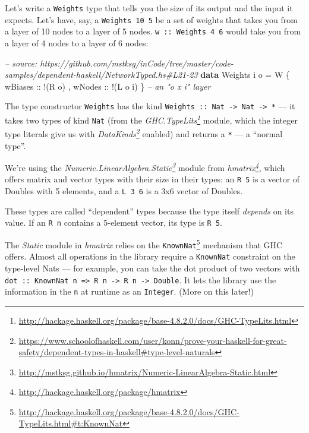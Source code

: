 \documentclass[]{article}
\newenvironment{Shaded}{}{}
\newcommand{\KeywordTok}[1]{\textcolor[rgb]{0.00,0.44,0.13}{\textbf{#1}}}
\newcommand{\DataTypeTok}[1]{\textcolor[rgb]{0.56,0.13,0.00}{#1}}
\newcommand{\CommentTok}[1]{\textcolor[rgb]{0.38,0.63,0.69}{\textit{#1}}}
\newcommand{\OtherTok}[1]{\textcolor[rgb]{0.00,0.44,0.13}{#1}}
\newcommand{\FunctionTok}[1]{\textcolor[rgb]{0.02,0.16,0.49}{#1}}
\newcommand{\NormalTok}[1]{#1}
\renewcommand{\href}[2]{#2\footnote{\url{#1}}}
\begin{document}
Let's write a \texttt{Weights} type that tells you the size of its output and
the input it expects. Let's have, say, a \texttt{Weights\ 10\ 5} be a set of
weights that takes you from a layer of 10 nodes to a layer of 5 nodes.
\texttt{w\ ::\ Weights\ 4\ 6} would take you from a layer of 4 nodes to a layer
of 6 nodes:

\begin{Shaded}
\begin{Highlighting}[]
\CommentTok{-- source: https://github.com/mstksg/inCode/tree/master/code-samples/dependent-haskell/NetworkTyped.hs#L21-23}
\KeywordTok{data} \DataTypeTok{Weights}\NormalTok{ i o }\FunctionTok{=} \DataTypeTok{W}\NormalTok{ \{}\OtherTok{ wBiases ::} \FunctionTok{!}\NormalTok{(}\DataTypeTok{R}\NormalTok{ o)}
\NormalTok{                     ,}\OtherTok{ wNodes  ::} \FunctionTok{!}\NormalTok{(}\DataTypeTok{L}\NormalTok{ o i)}
\NormalTok{                     \}                      }\CommentTok{-- an "o x i" layer}
\end{Highlighting}
\end{Shaded}

The type constructor \texttt{Weights} has the kind
\texttt{Weights\ ::\ Nat\ -\textgreater{}\ Nat\ -\textgreater{}\ *} --- it takes
two types of kind \texttt{Nat} (from the
\emph{\href{http://hackage.haskell.org/package/base-4.8.2.0/docs/GHC-TypeLits.html}{GHC.TypeLits}}
module, which the integer type literals give us with
\emph{\href{https://www.schoolofhaskell.com/user/konn/prove-your-haskell-for-great-safety/dependent-types-in-haskell\#type-level-naturals}{DataKinds}}
enabled) and returns a \texttt{*} --- a ``normal type''.

We're using the
\emph{\href{http://mstksg.github.io/hmatrix/Numeric-LinearAlgebra-Static.html}{Numeric.LinearAlgebra.Static}}
module from \emph{\href{http://hackage.haskell.org/package/hmatrix}{hmatrix}},
which offers matrix and vector types with their size in their types: an
\texttt{R\ 5} is a vector of Doubles with 5 elements, and a \texttt{L\ 3\ 6} is
a 3x6 vector of Doubles.

These types are called ``dependent'' types because the type itself
\emph{depends} on its value. If an \texttt{R\ n} contains a 5-element vector,
its type is \texttt{R\ 5}.

The \emph{Static} module in \emph{hmatrix} relies on the
\href{http://hackage.haskell.org/package/base-4.8.2.0/docs/GHC-TypeLits.html\#t:KnownNat}{\texttt{KnownNat}}
mechanism that GHC offers. Almost all operations in the library require a
\texttt{KnownNat} constraint on the type-level Nats --- for example, you can
take the dot product of two vectors with
\texttt{dot\ ::\ KnownNat\ n\ =\textgreater{}\ R\ n\ -\textgreater{}\ R\ n\ -\textgreater{}\ Double}.
It lets the library use the information in the \texttt{n} at runtime as an
\texttt{Integer}. (More on this later!)
\end{document}
